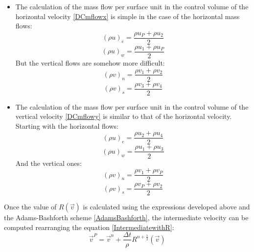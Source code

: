 \begin{itemize}
	\item The calculation of the mass flow per surface unit in the control volume of the horizontal velocity \ref{DCmflowx} is simple in the case of the horizontal mass flows:
	\begin{equation}
	\left(\rho u\right)_{e}=\frac{\rho u_{P}+\rho u_{2}}{2}
	\end{equation}
	\begin{equation}
	\left(\rho u\right)_{w}=\frac{\rho u_{1}+\rho u_{P}}{2}
	\end{equation}
	But the vertical flows are somehow more difficult:
	\begin{equation}
	\left(\rho v\right)_{n}=\frac{\rho v_{1}+\rho v_{2}}{2}
	\end{equation}
	\begin{equation}
	\left(\rho v\right)_{s}=\frac{\rho v_{3}+\rho v_{4}}{2}
	\end{equation}
	\item The calculation of the mass flow per surface unit in the control volume of the vertical velocity \ref{DCmflowy} is similar to that of the horizontal velocity. Starting with the horizontal flows:
	\begin{equation}
	\left(\rho u\right)_{e}=\frac{\rho u_{2}+\rho u_{4}}{2}
	\end{equation}
	\begin{equation}
	\left(\rho u\right)_{w}=\frac{\rho u_{1}+\rho u_{3}}{2}
	\end{equation}
	And the vertical ones:
	\begin{equation}
	\left(\rho v\right)_{n}=\frac{\rho v_{1}+\rho v_{P}}{2}
	\end{equation}
	\begin{equation}
	\left(\rho v\right)_{s}=\frac{\rho v_{P}+\rho v_{2}}{2}
	\end{equation}
\end{itemize}
Once the value of $R\left(\vec{v}\right)$ is calculated using the expressions developed above and the Adams-Bashforth scheme \ref{AdamsBashforth}, the intermediate velocity can be computed rearranging the equation \ref{IntermediatewithR}:
\begin{equation}
\vec{v}^{P}=\vec{v}^{n}+\frac{\Delta t}{\rho}R^{n+\frac{1}{2}}\left(\vec{v}\right)
\end{equation}

